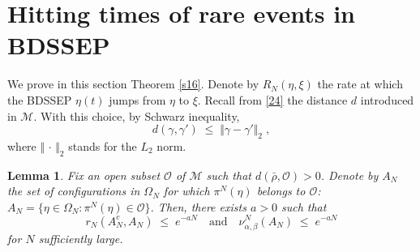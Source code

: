 \documentclass[reqno]{amsart}
\newtheorem{lemma}[theorem]{Lemma}
\begin{document}
\section{Hitting times of rare events in BDSSEP} 
\label{sec4}

We prove in this section Theorem \ref{s16}. Denote by $R_N(\eta,\xi)$
the rate at which the BDSSEP $\eta(t)$ jumps from $\eta$ to $\xi$.
Recall from \eqref{24} the distance $d$ introduced in ${{\mathscr M}}$. With
this choice, by Schwarz inequality,
\begin{equation}
\label{15}
d(\gamma,\gamma') \;\le\; \Vert \gamma - \gamma'\Vert_2\;,
\end{equation}
where $\Vert \,\cdot\,\Vert_2$ stands for the $L_2$ norm.

\begin{lemma}
\label{s12}
Fix an open subset ${{\mathscr O}}$ of ${{\mathscr M}}$ such that $d(\bar\rho, {{\mathscr O}})>0$.  Denote by $A_N$ the set of configurations in $\Omega_N$ for
which $\pi^N(\eta)$ belongs to ${{\mathscr O}}$: $A_N = \{\eta\in\Omega_N:
\pi^N(\eta)\in {{\mathscr O}}\}$. Then, there exists $a>0$ such that
\begin{equation*}
r_N(A^c_N,A_N)\;\le\; e^{-aN} \quad\text{and}\quad \nu^N_{\alpha,
  \beta} (A_N) \;\le\; e^{-aN}
\end{equation*}
for $N$ sufficiently large. 
\end{lemma}
\end{document}

